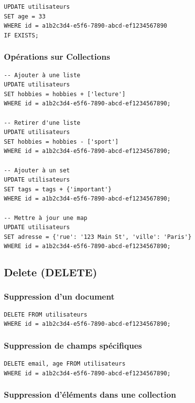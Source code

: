 \documentclass[11pt,a4paper]{article}
\begin{document}
\begin{lstlisting}
UPDATE utilisateurs
SET age = 33
WHERE id = a1b2c3d4-e5f6-7890-abcd-ef1234567890
IF EXISTS;
\end{lstlisting}

\subsubsection{Opérations sur Collections}

\begin{lstlisting}
-- Ajouter à une liste
UPDATE utilisateurs
SET hobbies = hobbies + ['lecture']
WHERE id = a1b2c3d4-e5f6-7890-abcd-ef1234567890;

-- Retirer d'une liste
UPDATE utilisateurs
SET hobbies = hobbies - ['sport']
WHERE id = a1b2c3d4-e5f6-7890-abcd-ef1234567890;

-- Ajouter à un set
UPDATE utilisateurs
SET tags = tags + {'important'}
WHERE id = a1b2c3d4-e5f6-7890-abcd-ef1234567890;

-- Mettre à jour une map
UPDATE utilisateurs
SET adresse = {'rue': '123 Main St', 'ville': 'Paris'}
WHERE id = a1b2c3d4-e5f6-7890-abcd-ef1234567890;
\end{lstlisting}

\subsection{Delete (DELETE)}

\subsubsection{Suppression d'un document}

\begin{lstlisting}
DELETE FROM utilisateurs
WHERE id = a1b2c3d4-e5f6-7890-abcd-ef1234567890;
\end{lstlisting}

\subsubsection{Suppression de champs spécifiques}

\begin{lstlisting}
DELETE email, age FROM utilisateurs
WHERE id = a1b2c3d4-e5f6-7890-abcd-ef1234567890;
\end{lstlisting}

\subsubsection{Suppression d'éléments dans une collection}
\end{document}
